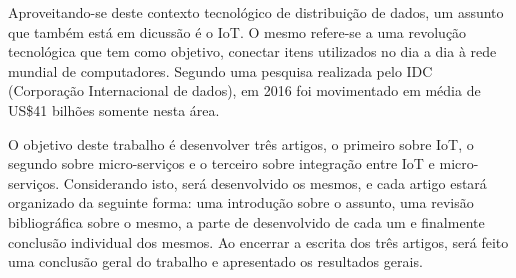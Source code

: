 Aproveitando-se deste contexto tecnológico de distribuição de dados, um assunto que também está em dicussão é o IoT. O mesmo refere-se a uma revolução tecnológica que tem como objetivo, conectar itens utilizados no dia a dia à rede mundial de computadores. Segundo uma pesquisa realizada pelo IDC (Corporação Internacional de dados), em 2016 foi movimentado em média de US\$41 bilhões somente nesta área.

O objetivo deste trabalho é desenvolver três artigos, o primeiro sobre IoT, o segundo sobre micro-serviços e o terceiro sobre integração entre IoT e micro-serviços. Considerando isto, será desenvolvido os mesmos, e cada artigo estará organizado da seguinte forma: uma introdução sobre o assunto, uma revisão bibliográfica sobre o mesmo, a parte de desenvolvido de cada um e finalmente conclusão individual dos mesmos. Ao encerrar a escrita dos três artigos, será feito uma conclusão geral do trabalho e apresentado os resultados gerais.

